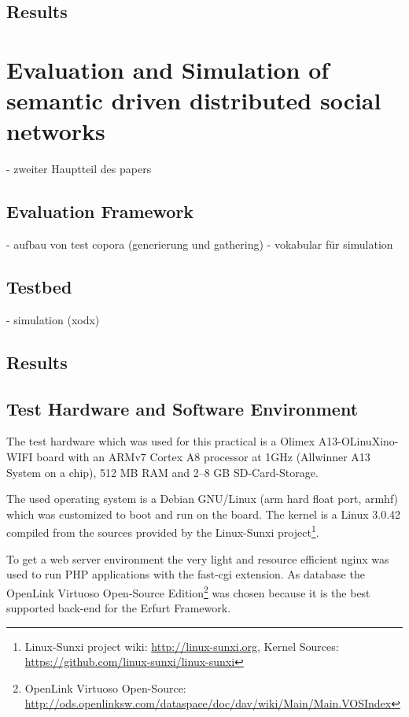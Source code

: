 \documentclass{llncs}
\begin{document}
\subsection{Results}


\section{Evaluation and Simulation of semantic driven distributed social networks}

- zweiter Hauptteil des papers

\subsection{Evaluation Framework}
- aufbau von test copora (generierung und gathering)
- vokabular für simulation

\subsection{Testbed}
- simulation (xodx)

\subsection{Results}


\subsection{Test Hardware and Software Environment}
The test hardware which was used for this practical is a Olimex A13-OLinuXino-WIFI board with an ARMv7 Cortex A8 processor at 1GHz (Allwinner A13 System on a chip), 512 MB RAM and 2–8 GB SD-Card-Storage.

The used operating system is a Debian GNU/Linux (arm hard float port, armhf) which was customized to boot and run on the board.
The kernel is a Linux 3.0.42 compiled from the sources provided by the Linux-Sunxi project\footnote{Linux-Sunxi project wiki: \url{http://linux-sunxi.org}, Kernel Sources: \url{https://github.com/linux-sunxi/linux-sunxi}}.

To get a web server environment the very light and resource efficient nginx was used to run PHP applications with the fast-cgi extension.
As database the Open\-Link Vir\-tu\-oso Open-Source Edition\footnote{Open\-Link Vir\-tu\-oso Open-Source: \url{http://ods.openlinksw.com/dataspace/doc/dav/wiki/Main/Main.VOSIndex}} was chosen because it is the best supported back-end for the Erfurt Framework.


\todos



\end{document}

